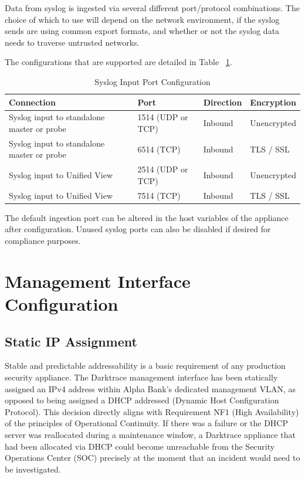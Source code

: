 \documentclass[12pt,a4paper]{report}
\begin{document}
Data from syslog is ingested via several different port/protocol combinations. The choice of which to use will depend on the network environment, if the syslog sends are using common export formats, and whether or not the syslog data needs to traverse untrusted networks.

The configurations that are supported are detailed in Table ~\ref{tab:syslog-ports}.

\begin{table}[H]
  \centering
  \captionsetup{singlelinecheck=false, justification=raggedright}
  \caption{Syslog Input Port Configuration}
  \label{tab:syslog-ports}
  \renewcommand{\arraystretch}{1.4}
  \begin{tabularx}{\textwidth}{X p{3.2cm} p{2.4cm} p{2.5cm}}
    \toprule
    \textbf{Connection} & \textbf{Port} & \textbf{Direction} & \textbf{Encryption} \\
    \midrule
    Syslog input to standalone master or probe & 1514 (UDP or TCP) & Inbound & Unencrypted \\
    Syslog input to standalone master or probe & 6514 (TCP)        & Inbound & TLS / SSL \\
    Syslog input to Unified View               & 2514 (UDP or TCP) & Inbound & Unencrypted \\
    Syslog input to Unified View               & 7514 (TCP)        & Inbound & TLS / SSL \\
    \bottomrule
  \end{tabularx}
\end{table}

The default ingestion port can be altered in the host variables of the appliance
after configuration. Unused syslog ports can also be disabled if desired for
compliance purposes.



\section{Management Interface Configuration}

\subsection{Static IP Assignment}

Stable and predictable addressability is a basic requirement of any production security appliance. The Darktrace management interface has been statically assigned an IPv4 address within Alpha Bank’s dedicated management VLAN, as opposed to being assigned a DHCP addressed (Dynamic Host Configuration Protocol). This decision directly aligns with Requirement NF1 (High Availability) of the principles of Operational Continuity. If there was a failure or the DHCP server was reallocated during a maintenance window, a Darktrace appliance that had been allocated via DHCP could become unreachable from the Security Operations Center (SOC) precisely at the moment that an incident would need to be investigated.\\
\end{document}
